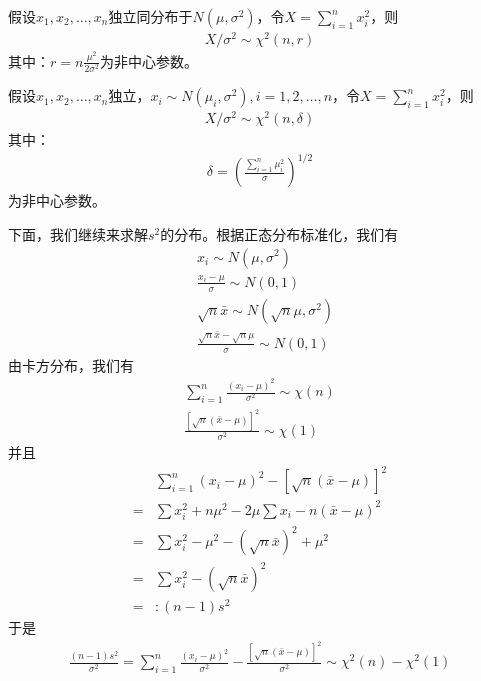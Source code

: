         \begin{corollary}[卡方分布的一般形式2]
        假设$x_1,x_2,\dots,x_n$独立同分布于$N(\mu,\sigma^2)$，令$X = \sum_{i= 1}^nx_i^2$，则
        \begin{align*}
        X/\sigma^2 \sim \chi^2(n,r)
        \end{align*}
        其中：$r = n\frac{\mu^2}{2\sigma^2}$为非中心参数。
        \end{corollary}
        \begin{corollary}[卡方分布的一般形式3]
        假设$x_1,x_2,\dots,x_n$独立，$x_i\sim N(\mu_i,\sigma^2),i = 1,2,\dots,n$，令$X = \sum_{i= 1}^nx_i^2$，则
        \begin{align*}
        X/\sigma^2 \sim \chi^2(n,\delta)
        \end{align*}
        其中：
        \begin{align*}
        \delta = \left( \frac{\sum_{i = 1}^n \mu_i^2 }{\sigma}\right)^{1/2}
        \end{align*}
         为非中心参数。
        \end{corollary}
        \par
        下面，我们继续来求解$s^2$的分布。根据正态分布标准化，我们有
        \begin{align*}
        &x_i \sim N(\mu,\sigma^2)\\
        &\frac{x_i - \mu}{\sigma}\sim N(0,1)\\
        &\sqrt{n}\bar{x}\sim N(\sqrt{n}\mu,\sigma^2)\\
        &\frac{\sqrt{n}\bar{x} - \sqrt{n}\mu}{\sigma} \sim N(0,1)
        \end{align*}
        由卡方分布，我们有
        \begin{align*}
        \sum_{i = 1}^n \frac{(x_i - \mu)^2}{\sigma^2}\sim \chi(n)\\
        \frac{[\sqrt{n}(\bar{x}-\mu)]^2}{\sigma^2} \sim \chi(1)
        \end{align*}
        并且
        \begin{align*}
        &\sum_{i = 1}^n (x_i - \mu)^2 - [\sqrt{n}(\bar{x}-\mu)]^2\\
        =&\sum x_i^2+n\mu^2 -2\mu \sum x_i - n(\bar{x}-\mu)^2\\
        =&\sum x_i^2 - \mu^2 - (\sqrt{n}\bar{x})^2+\mu^2\\
        =&\sum x_i^2- (\sqrt{n}\bar{x})^2\\
        =&: (n-1)s^2
        \end{align*}
        于是
        \begin{align*}
        \frac{(n-1)s^2}{\sigma^2} = \sum_{i = 1}^n \frac{(x_i - \mu)^2}{\sigma^2}- \frac{[\sqrt{n}(\bar{x}-\mu)]^2}{\sigma^2}\sim \chi^2 (n) - \chi^2(1)
        \end{align*}
